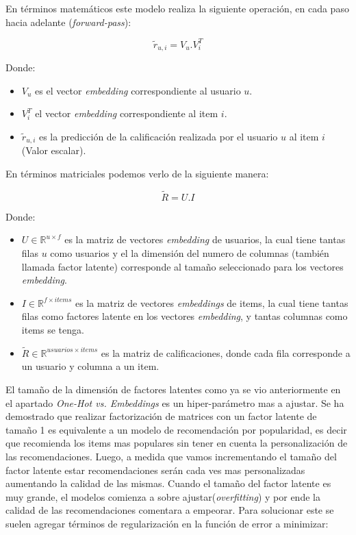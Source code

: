 \documentclass[11pt,a4paper,twoside]{thesis}
\begin{document}
\clearpage

En términos matemáticos este modelo realiza la siguiente operación, en cada
paso hacia adelante (\textit{forward-pass}):

\begin{equation}
	\tilde{r}_{u, i} = V_u . V_i^{T}
\end{equation}
\begin{description}
	\item[Donde:]
\end{description}
\begin{itemize}
	\item $V_u$ es el vector \textit{embedding} correspondiente al usuario $u$.
	\item $V_i^{T}$ el vector \textit{embedding} correspondiente al item $i$.
	\item $ \tilde{r}_{u, i}$ es la predicción de la calificación realizada por el usuario $u$ al item $i$ (Valor escalar).
\end{itemize}

En términos matriciales podemos verlo de la siguiente manera:

\begin{equation}
	\tilde{R} = U.I
\end{equation}
\begin{description}
	\item[Donde:]
\end{description}
\begin{itemize}
	\item $U\in\mathbb{R}^{u \times f}$ es la matriz de vectores \textit{embedding} de usuarios, la cual tiene tantas filas $u$ como usuarios y el la dimensión del numero de columnas (también llamada factor latente) corresponde al tamaño seleccionado para los vectores \textit{embedding}.
	\item $I\in\mathbb{R}^{f\times items}$ es la matriz de vectores \textit{embeddings} de items, la cual tiene tantas filas como factores latente en los vectores \textit{embedding}, y tantas columnas como items se tenga.
	\item $\tilde{R}\in\mathbb{R}^{usuarios \times items}$ es la matriz de calificaciones, donde cada fila corresponde a un usuario y columna a un item.
\end{itemize}

El tamaño de la dimensión de factores latentes como ya se vio anteriormente en
el apartado \textit{One-Hot vs. Embeddings} es un hiper-parámetro mas a
ajustar. Se ha demostrado \cite{embeddingsizedem} que realizar factorización de
matrices con un factor latente de tamaño 1 es equivalente a un modelo de
recomendación por popularidad, es decir que recomienda los items mas populares
sin tener en cuenta la personalización de las recomendaciones. Luego, a medida
que vamos incrementando el tamaño del factor latente estar recomendaciones
serán cada ves mas personalizadas aumentando la calidad de las mismas. Cuando
el tamaño del factor latente es muy grande, el modelos comienza a sobre
ajustar(\textit{overfitting}) y por ende la calidad de las recomendaciones
comentara a empeorar. Para solucionar este se suelen agregar términos de
regularización en la función de error a minimizar:
\end{document}
